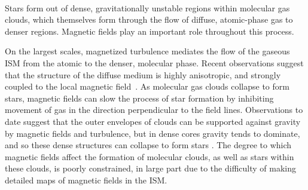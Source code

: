 \documentclass[PICOReport.tex]{subfiles}
\begin{document}
 \\
Stars form out of dense, gravitationally unstable regions within molecular gas clouds, which themselves form through the flow of diffuse, atomic-phase gas to denser regions. Magnetic fields play an important role throughout this process. 

On the largest scales, magnetized turbulence mediates the flow of the gaseous \ac{ISM} from the atomic to the denser, molecular phase. Recent observations suggest that the structure of the diffuse medium is highly anisotropic, and strongly coupled to the local magnetic field~\citep{Clark:2014, Clark:2015, Kalberla:2016, KalberlaKerp:2016}. 
As molecular gas clouds collapse to form stars, magnetic fields can slow the process of star formation by inhibiting movement of gas in the direction perpendicular to the field lines. Observations to date suggest that the outer envelopes of clouds can be supported against gravity by magnetic fields and turbulence, but in dense cores gravity tends to dominate, and so these dense structures can collapse to form stars \citep{Crutcher2010}.  The degree to which magnetic fields affect the formation of molecular clouds, as well as stars within these clouds,  is poorly constrained, in large part due to the difficulty of making detailed maps of magnetic fields in the ISM.


\end{document}
